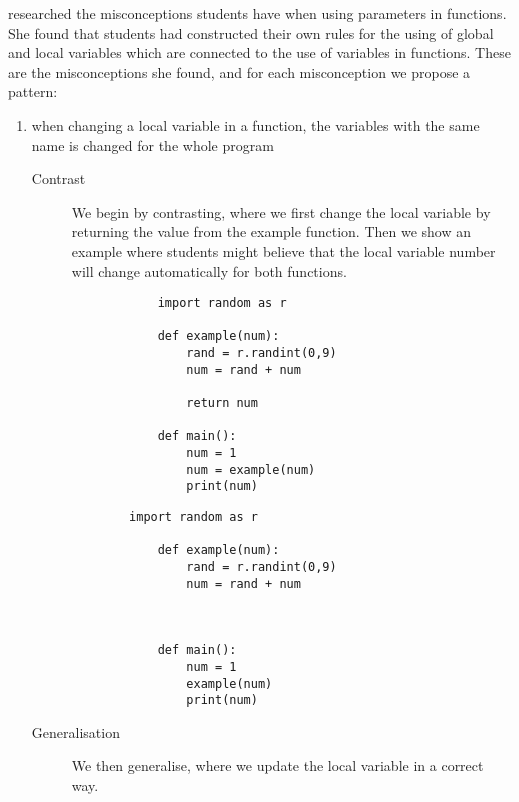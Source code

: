 \Textcite{Fleury1991} researched the 
misconceptions students have when using parameters in functions.
She found that students had constructed their own rules for the using 
of global and local variables which are connected to the use of variables 
in 
functions. These are the misconceptions she found, and for each 
misconception we propose a pattern: 

\begin{enumerate}
    \item when changing a local variable in a function, the variables with 
the same name is changed for the whole program

    \begin{description}
        \item[Contrast] We begin by contrasting, where we first change the 
local variable by returning the value from the example function. 
Then we show an example where students might believe that the 
local variable number will change automatically for both functions. 
    
    \hfill
     \begin{minipage}[t]{0.4\columnwidth}
        \begin{verbatim}
            import random as r
            
            def example(num):
                rand = r.randint(0,9)
                num = rand + num

                return num

            def main():
                num = 1
                num = example(num)
                print(num)
        \end{verbatim}
    \end{minipage}
\hfill
 \hfill
    \begin{minipage}[t]{0.4\columnwidth}
        \begin{verbatim}
        import random as r
        
            def example(num):
                rand = r.randint(0,9)
                num = rand + num



            def main():
                num = 1
                example(num)
                print(num)
        \end{verbatim}
    \end{minipage}
\hfill


    \item[Generalisation] We then generalise, where we update the local 
variable in a correct way.


\end{description}
\end{enumerate}
